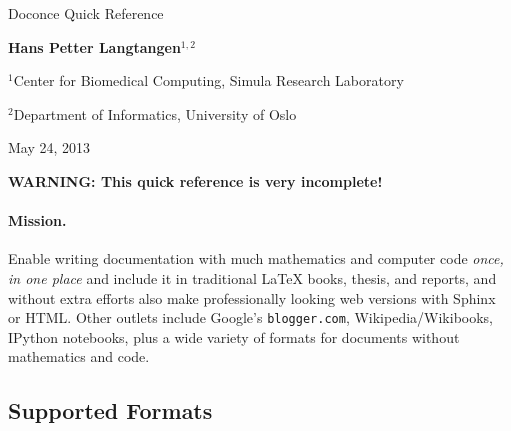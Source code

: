 \documentclass[%
oneside,                 %
final,                   %
10pt]{article}
\begin{document}



\begin{center}
{\LARGE\bf
\begin{spacing}{1.25}
Doconce Quick Reference
\end{spacing}
}
\end{center}


\begin{center}
{\bf Hans Petter Langtangen${}^{1, 2}$} \\ [0mm]
\end{center}

\begin{center}
\centerline{{\small ${}^1$Center for Biomedical Computing, Simula Research Laboratory}}
\centerline{{\small ${}^2$Department of Informatics, University of Oslo}}
\end{center}


\begin{center}
May 24, 2013
\end{center}

\vspace{1cm}



\tableofcontents

\vspace{1cm} %





\textbf{WARNING: This quick reference is very incomplete!}

\paragraph{Mission.}
Enable writing documentation with much mathematics and
computer code \emph{once, in one place} and include it in traditional {\LaTeX}
books, thesis, and reports, and without extra efforts also make
professionally looking web versions with Sphinx or HTML. Other outlets
include Google's \Verb!blogger.com!, Wikipedia/Wikibooks, IPython
notebooks, plus a wide variety of formats for documents without
mathematics and code.

\subsection{Supported Formats}
\end{document}
